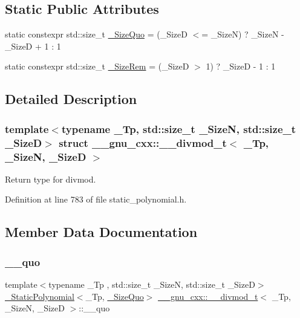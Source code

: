 \subsection*{Static Public Attributes}
\begin{DoxyCompactItemize}
\item 
static constexpr std\+::size\+\_\+t \hyperlink{struct____gnu__cxx_1_1____divmod__t_a813f65f5716a3d6b124020686b294a24}{\+\_\+\+Size\+Quo} = (\+\_\+\+SizeD $<$= \+\_\+\+SizeN) ? \+\_\+\+SizeN -\/ \+\_\+\+SizeD + 1 \+: 1
\item 
static constexpr std\+::size\+\_\+t \hyperlink{struct____gnu__cxx_1_1____divmod__t_a77870c1b7361b2b7511b0ef4d958826c}{\+\_\+\+Size\+Rem} = (\+\_\+\+SizeD $>$ 1) ? \+\_\+\+SizeD -\/ 1 \+: 1
\end{DoxyCompactItemize}


\subsection{Detailed Description}
\subsubsection*{template$<$typename \+\_\+\+Tp, std\+::size\+\_\+t \+\_\+\+SizeN, std\+::size\+\_\+t \+\_\+\+SizeD$>$\newline
struct \+\_\+\+\_\+gnu\+\_\+cxx\+::\+\_\+\+\_\+divmod\+\_\+t$<$ \+\_\+\+Tp, \+\_\+\+Size\+N, \+\_\+\+Size\+D $>$}

Return type for divmod. 

Definition at line 783 of file static\+\_\+polynomial.\+h.



\subsection{Member Data Documentation}
\mbox{\label{struct____gnu__cxx_1_1____divmod__t_a2d1cdc2ca4c92306d199cb1b70c1b7a2}} 
\subsubsection{\texorpdfstring{\+\_\+\+\_\+quo}{\_\_quo}}
{\footnotesize\ttfamily template$<$typename \+\_\+\+Tp , std\+::size\+\_\+t \+\_\+\+SizeN, std\+::size\+\_\+t \+\_\+\+SizeD$>$ \\
\hyperlink{class____gnu__cxx_1_1__StaticPolynomial}{\+\_\+\+Static\+Polynomial}$<$\+\_\+\+Tp, \hyperlink{struct____gnu__cxx_1_1____divmod__t_a813f65f5716a3d6b124020686b294a24}{\+\_\+\+Size\+Quo}$>$ \hyperlink{struct____gnu__cxx_1_1____divmod__t}{\+\_\+\+\_\+gnu\+\_\+cxx\+::\+\_\+\+\_\+divmod\+\_\+t}$<$ \+\_\+\+Tp, \+\_\+\+SizeN, \+\_\+\+SizeD $>$\+::\+\_\+\+\_\+quo}



